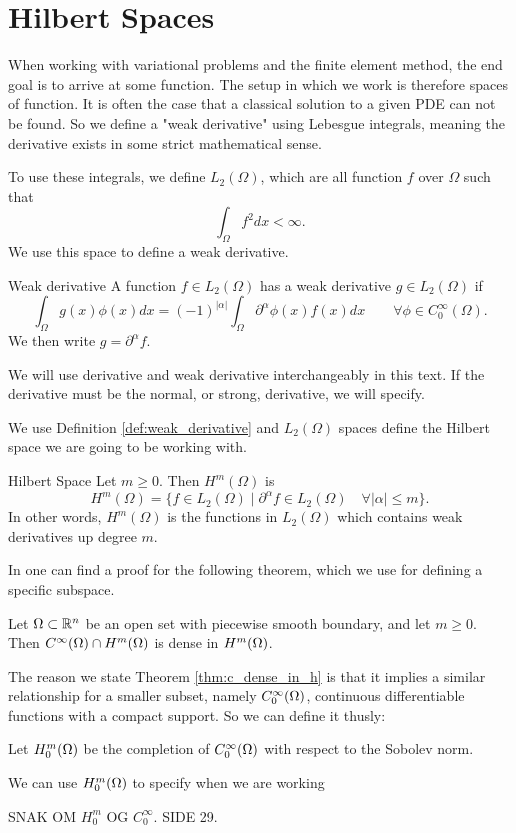 \section{Hilbert Spaces}
When working with variational problems and the finite 
element method, the end goal is to arrive at some function.
The setup in which we work is therefore spaces of function. 
It is often the case that a classical solution to a given PDE can 
not be found. 
So we define a "weak derivative" using Lebesgue integrals, meaning 
the derivative exists in some strict mathematical sense. 

To use these integrals, we define $L_2(\Omega)$, which are all 
function $f$ over $\Omega$ such that 
\begin{equation*}
   \int_\Omega f^2 dx < \infty. 
\end{equation*}
We use this space to define a weak derivative.
\begin{defn}{Weak derivative}
    A function $f \in L_2(\Omega)$ has a weak derivative $g \in L_2(\Omega)$
    if
    \begin{equation*}
        \int_\Omega g(x)\phi(x) dx = (-1)^{|\alpha|}\int_\Omega 
        \partial ^{\alpha}\phi(x) f(x) dx
        \quad\quad \forall \phi \in C^\infty_0(\Omega).
    \end{equation*}
    We then write $g=\partial ^{\alpha}f$.
    \label{def:weak_derivative}
\end{defn}
We will use derivative and weak derivative interchangeably in this 
text.
If the derivative must be the normal, or strong, derivative, we will 
specify. 

We use Definition \ref*{def:weak_derivative} and $L_2(\Omega)$ spaces 
define the Hilbert space we are going to be working with. 
\begin{defn}{Hilbert Space}
   Let $m \geq 0$. Then $H^m(\Omega)$ is 
   \begin{equation*}
    H^m(\Omega) = \{  f \in L_2(\Omega) \mid \partial ^{\alpha}f \in 
    L_2(\Omega) \quad \forall |\alpha| \leq m  \}.
   \end{equation*}
   In other words, $H^m(\Omega)$ is the functions in $L_2(\Omega)$ 
   which contains weak derivatives up degree $m$.
\end{defn}
In \cite{Brezis} one can find a proof for the following theorem, which 
we use for defining a specific subspace.
\begin{thmx}{\quad}
   Let $\Omega \subset \mathbb{R}^n$ be an open set with piecewise smooth boundary, 
   and let $m \geq 0$. Then $C^\infty (\Omega) \cap H^m(\Omega)$ is dense in 
   $H^m(\Omega)$.
   \label{thm:c_dense_in_h}
\end{thmx}
The reason we state Theorem \ref{thm:c_dense_in_h} is that it implies a 
similar relationship for a smaller subset, namely $C^\infty_0(\Omega)$, 
continuous differentiable functions with a compact support. So we can 
define it thusly:
\begin{defn}{\quad}
  Let $H_0^m(\Omega)$ be the completion of $C^\infty_0(\Omega)$ with respect 
  to the Sobolev norm.
\end{defn} 
We can use $H_0^m(\Omega)$ to specify when we are working  


SNAK OM $H_0^m$ OG $C_0^{\infty}$. SIDE 29.